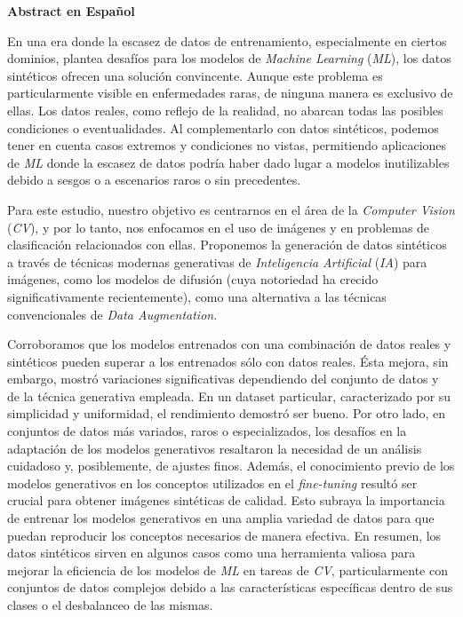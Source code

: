 \newpage
{\huge\bfseries \space Abstract en Español}
\bigskip
\bigskip

En una era donde la escasez de datos de entrenamiento, especialmente en ciertos dominios, plantea desafíos para los modelos de \textit{Machine Learning} (\textit{ML}), los datos sintéticos ofrecen una solución convincente. Aunque este problema es particularmente visible en enfermedades raras, de ninguna manera es exclusivo de ellas. Los datos reales, como reflejo de la realidad, no abarcan todas las posibles condiciones o eventualidades. Al complementarlo con datos sintéticos, podemos tener en cuenta casos extremos y condiciones no vistas, permitiendo aplicaciones de \textit{ML} donde la escasez de datos podría haber dado lugar a modelos inutilizables debido a sesgos o a escenarios raros o sin precedentes.

Para este estudio, nuestro objetivo es centrarnos en el área de la \textit{Computer Vision} (\textit{CV}), y por lo tanto, nos enfocamos en el uso de imágenes y en problemas de clasificación relacionados con ellas. Proponemos la generación de datos sintéticos a través de técnicas modernas generativas de \textit{Inteligencia Artificial} (\textit{IA}) para imágenes, como los modelos de difusión (cuya notoriedad ha crecido significativamente recientemente), como una alternativa a las técnicas convencionales de \textit{Data Augmentation}.

Corroboramos que los modelos entrenados con una combinación de datos reales y sintéticos pueden superar a los entrenados sólo con datos reales. Ésta mejora, sin embargo, mostró variaciones significativas dependiendo del conjunto de datos y de la técnica generativa empleada. En un dataset particular, caracterizado por su simplicidad y uniformidad, el rendimiento demostró ser bueno. Por otro lado, en conjuntos de datos más variados, raros o especializados, los desafíos en la adaptación de los modelos generativos resaltaron la necesidad de un análisis cuidadoso y, posiblemente, de ajustes finos. Además, el conocimiento previo de los modelos generativos en los conceptos utilizados en el \textit{fine-tuning} resultó ser crucial para obtener imágenes sintéticas de calidad. Esto subraya la importancia de entrenar los modelos generativos en una amplia variedad de datos para que puedan reproducir los conceptos necesarios de manera efectiva. En resumen, los datos sintéticos sirven en algunos casos como una herramienta valiosa para mejorar la eficiencia de los modelos de \textit{ML} en tareas de \textit{CV}, particularmente con conjuntos de datos complejos debido a las características específicas dentro de sus clases o el desbalanceo de las mismas.


